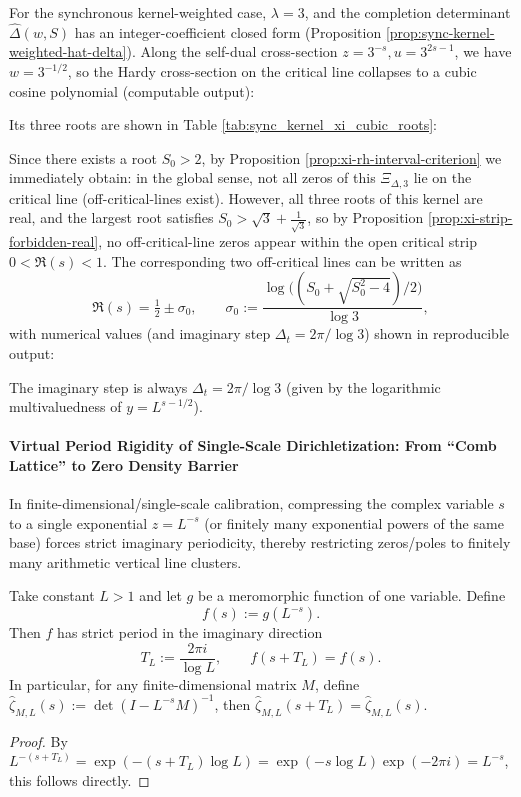 \begin{remark}\label{rem:sync-kernel-xi-cubic}
For the synchronous kernel-weighted case, \(\lambda=3\), and the completion determinant \(\widehat\Delta(w,S)\) has an integer-coefficient closed form (Proposition \ref{prop:sync-kernel-weighted-hat-delta}).
Along the self-dual cross-section \(z=3^{-s},u=3^{2s-1}\), we have \(w=3^{-1/2}\), so the Hardy cross-section on the critical line collapses to a cubic cosine polynomial (computable output):

Its three roots are shown in Table \ref{tab:sync_kernel_xi_cubic_roots}:

Since there exists a root \(S_0>2\), by Proposition \ref{prop:xi-rh-interval-criterion} we immediately obtain: in the global sense, not all zeros of this \(\Xi_{\Delta,3}\) lie on the critical line (off-critical-lines exist).
However, all three roots of this kernel are real, and the largest root satisfies \(S_0>\sqrt{3}+\tfrac{1}{\sqrt{3}}\), so by Proposition \ref{prop:xi-strip-forbidden-real}, no off-critical-line zeros appear within the open critical strip \(0<\Re(s)<1\).
The corresponding two off-critical lines can be written as
\[
\Re(s)=\tfrac12\pm\sigma_0,\qquad
\sigma_0:=\frac{\log\bigl((S_0+\sqrt{S_0^2-4})/2\bigr)}{\log 3},
\]
with numerical values (and imaginary step \(\Delta_t=2\pi/\log 3\)) shown in reproducible output:

The imaginary step is always \(\Delta_t=2\pi/\log 3\) (given by the logarithmic multivaluedness of \(y=L^{s-1/2}\)).
\end{remark}

\paragraph{Virtual Period Rigidity of Single-Scale Dirichletization: From ``Comb Lattice'' to Zero Density Barrier}
In finite-dimensional/single-scale calibration, compressing the complex variable \(s\) to a single exponential \(z=L^{-s}\) (or finitely many exponential powers of the same base) forces strict imaginary periodicity, thereby restricting zeros/poles to finitely many arithmetic vertical line clusters.

\begin{proposition}\label{prop:single-scale-dirichlet-imag-period}
Take constant \(L>1\) and let \(g\) be a meromorphic function of one variable. Define
\[
f(s):=g(L^{-s}).
\]
Then \(f\) has strict period in the imaginary direction
\[
T_L:=\frac{2\pi i}{\log L},\qquad f(s+T_L)=f(s).
\]
In particular, for any finite-dimensional matrix \(M\), define
\(
\widehat{\zeta}_{M,L}(s):=\det(I-L^{-s}M)^{-1}
\), then \(\widehat{\zeta}_{M,L}(s+T_L)=\widehat{\zeta}_{M,L}(s)\).
\end{proposition}
\begin{proof}
By \(L^{-(s+T_L)}=\exp(-(s+T_L)\log L)=\exp(-s\log L)\exp(-2\pi i)=L^{-s}\), this follows directly.
\end{proof}


